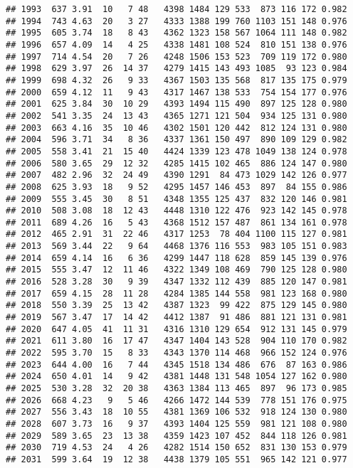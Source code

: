\documentclass[]{article}
\begin{document}
\begin{verbatim}
## 1993  637 3.91  10   7 48   4398 1484 129 533  873 116 172 0.982
## 1994  743 4.63  20   3 27   4333 1388 199 760 1103 151 148 0.976
## 1995  605 3.74  18   8 43   4362 1323 158 567 1064 111 148 0.982
## 1996  657 4.09  14   4 25   4338 1481 108 524  810 151 138 0.976
## 1997  714 4.54  20   7 26   4248 1506 153 523  709 119 172 0.980
## 1998  629 3.97  26  14 37   4279 1415 143 493 1085  93 123 0.984
## 1999  698 4.32  26   9 33   4367 1503 135 568  817 135 175 0.979
## 2000  659 4.12  11   9 43   4317 1467 138 533  754 154 177 0.976
## 2001  625 3.84  30  10 29   4393 1494 115 490  897 125 128 0.980
## 2002  541 3.35  24  13 43   4365 1271 121 504  934 125 131 0.980
## 2003  663 4.16  35  10 46   4302 1501 120 442  812 124 131 0.980
## 2004  596 3.71  34   8 36   4337 1361 150 497  890 109 129 0.982
## 2005  558 3.41  21  15 40   4424 1339 123 478 1049 138 124 0.978
## 2006  580 3.65  29  12 32   4285 1415 102 465  886 124 147 0.980
## 2007  482 2.96  32  24 49   4390 1291  84 473 1029 142 126 0.977
## 2008  625 3.93  18   9 52   4295 1457 146 453  897  84 155 0.986
## 2009  555 3.45  30   8 51   4348 1355 125 437  832 120 146 0.981
## 2010  508 3.08  18  12 43   4448 1310 122 476  923 142 145 0.978
## 2011  689 4.26  16   5 43   4368 1512 157 487  861 134 161 0.978
## 2012  465 2.91  31  22 46   4317 1253  78 404 1100 115 127 0.981
## 2013  569 3.44  22   9 64   4468 1376 116 553  983 105 151 0.983
## 2014  659 4.14  16   6 36   4299 1447 118 628  859 145 139 0.976
## 2015  555 3.47  12  11 46   4322 1349 108 469  790 125 128 0.980
## 2016  528 3.28  30   9 39   4347 1332 112 439  885 120 147 0.981
## 2017  659 4.15  28  11 28   4284 1385 144 558  981 123 168 0.980
## 2018  550 3.39  25  13 42   4387 1323  99 422  875 129 145 0.980
## 2019  567 3.47  17  14 42   4412 1387  91 486  881 121 131 0.981
## 2020  647 4.05  41  11 31   4316 1310 129 654  912 131 145 0.979
## 2021  611 3.80  16  17 47   4347 1404 143 528  904 110 170 0.982
## 2022  595 3.70  15   8 33   4343 1370 114 468  966 152 124 0.976
## 2023  644 4.00  16   7 44   4345 1518 134 486  676  87 163 0.986
## 2024  650 4.01  14   9 42   4381 1448 131 548 1054 127 162 0.980
## 2025  530 3.28  32  20 38   4363 1384 113 465  897  96 173 0.985
## 2026  668 4.23   9   5 46   4266 1472 144 539  778 151 176 0.975
## 2027  556 3.43  18  10 55   4381 1369 106 532  918 124 130 0.980
## 2028  607 3.73  16   9 37   4393 1404 125 559  981 121 108 0.980
## 2029  589 3.65  23  13 38   4359 1423 107 452  844 118 126 0.981
## 2030  719 4.53  24   4 26   4282 1514 150 652  831 130 153 0.979
## 2031  599 3.64  19  12 38   4438 1379 105 551  965 142 121 0.977

\end{verbatim}
\end{document}
